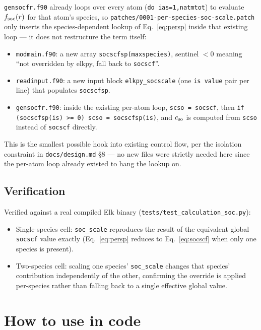 \documentclass[11pt]{article}
\begin{document}
\texttt{gensocfr.f90} already loops over every atom (\texttt{do ias=1,natmtot}) to
evaluate $f_{\rm soc}(r)$ for that atom's species, so
\texttt{patches/0001-per-species-soc-scale.patch} only inserts the species-dependent
lookup of Eq.~\eqref{eq:persp} inside that existing loop — it does not restructure the
term itself:
\begin{itemize}
  \item \texttt{modmain.f90}: a new array \texttt{socscfsp(maxspecies)}, sentinel
    $< 0$ meaning ``not overridden by elkpy, fall back to \texttt{socscf}''.
  \item \texttt{readinput.f90}: a new input block \texttt{elkpy\_socscale} (one
    \texttt{is~value} pair per line) that populates \texttt{socscfsp}.
  \item \texttt{gensocfr.f90}: inside the existing per-atom loop, \texttt{scso =
    socscf}, then \texttt{if (socscfsp(is) >= 0) scso = socscfsp(is)}, and $c_{\rm so}$
    is computed from \texttt{scso} instead of \texttt{socscf} directly.
\end{itemize}
This is the smallest possible hook into existing control flow, per the isolation
constraint in \texttt{docs/design.md} §8 — no new files were strictly needed here since
the per-atom loop already existed to hang the lookup on.

\subsection{Verification}

Verified against a real compiled Elk binary (\texttt{tests/test\_calculation\_soc.py}):
\begin{itemize}
  \item Single-species cell: \texttt{soc\_scale} reproduces the result of the
    equivalent global \texttt{socscf} value exactly (Eq.~\eqref{eq:persp} reduces to
    Eq.~\eqref{eq:socscf} when only one species is present).
  \item Two-species cell: scaling one species' \texttt{soc\_scale} changes that
    species' contribution independently of the other, confirming the override is
    applied per-species rather than falling back to a single effective global value.
\end{itemize}

\section{How to use in code}
\end{document}
